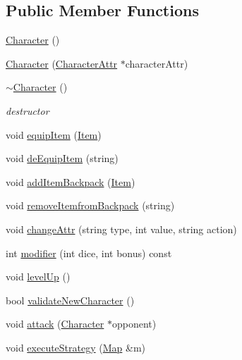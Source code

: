 \subsection*{Public Member Functions}
\begin{DoxyCompactItemize}
\item 
\hyperlink{class_character_adc27bdd255876169bad2ed0bae0cffb5}{Character} ()
\item 
\hyperlink{class_character_af8ad7b41d5fe3f11be89af54328666d1}{Character} (\hyperlink{class_character_attr}{Character\+Attr} $\ast$character\+Attr)
\item 
\hypertarget{class_character_a9e9be564d05ded80962b2045aa70b3fc}{}\label{class_character_a9e9be564d05ded80962b2045aa70b3fc} 
\hyperlink{class_character_a9e9be564d05ded80962b2045aa70b3fc}{$\sim$\+Character} ()
\begin{DoxyCompactList}\small\item\em destructor \end{DoxyCompactList}\item 
void \hyperlink{class_character_a0f26eec17d32dd07f241b7a68da2adfa}{equip\+Item} (\hyperlink{class_item}{Item})
\item 
void \hyperlink{class_character_ae64aa656b7e1cef588044ae6311b62e8}{de\+Equip\+Item} (string)
\item 
void \hyperlink{class_character_aacd0abef0d28fac92a90d6544fe3984d}{add\+Item\+Backpack} (\hyperlink{class_item}{Item})
\item 
void \hyperlink{class_character_a1238d246855052b98f8c6f525e238bba}{remove\+Itemfrom\+Backpack} (string)
\item 
void \hyperlink{class_character_a22626ae2ff021944ef418500e74ae809}{change\+Attr} (string type, int value, string action)
\item 
int \hyperlink{class_character_a1993821300c40564da5ec71e6fe32445}{modifier} (int dice, int bonus) const
\item 
void \hyperlink{class_character_aaaffb44b62eb70df0e545700c6011210}{level\+Up} ()
\item 
bool \hyperlink{class_character_adae2bb0e0bb6b8d010be6d1ac3b1fd5f}{validate\+New\+Character} ()
\item 
void \hyperlink{class_character_acad4e0ee6d71fe3a120b36c7d7082c01}{attack} (\hyperlink{class_character}{Character} $\ast$opponent)
\item 
void \hyperlink{class_character_a67e50bbbfdf69cce320c1b5079f5f052}{execute\+Strategy} (\hyperlink{class_map}{Map} \&m)
\item 

\end{DoxyCompactItemize}
